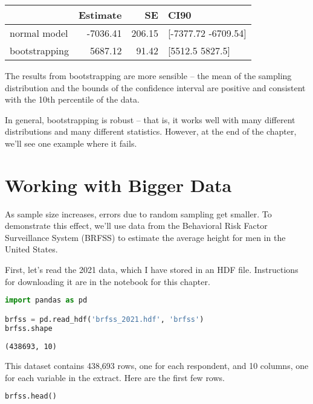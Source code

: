 \begin{tabular}{lrrl}
\toprule
 & Estimate & SE & CI90 \\
\midrule
normal model & -7036.41 & 206.15 & [-7377.72 -6709.54] \\
bootstrapping & 5687.12 & 91.42 & [5512.5 5827.5] \\
\bottomrule
\end{tabular}

The results from bootstrapping are more sensible -- the mean of the
sampling distribution and the bounds of the confidence interval are
positive and consistent with the 10th percentile of the data.

In general, bootstrapping is robust -- that is, it works well with many
different distributions and many different statistics. However, at the
end of the chapter, we'll see one example where it fails.

\section{Working with Bigger Data}\label{working-with-bigger-data}

As sample size increases, errors due to random sampling get smaller. To
demonstrate this effect, we'll use data from the Behavioral Risk Factor
Surveillance System (BRFSS) to estimate the average height for men in
the United States.

\pagebreak

First, let's read the 2021 data, which I have stored in an HDF file.
Instructions for downloading it are in the notebook for this chapter.

\begin{lstlisting}[language=Python,style=source]
import pandas as pd

brfss = pd.read_hdf('brfss_2021.hdf', 'brfss')
brfss.shape
\end{lstlisting}

\begin{lstlisting}[style=output]
(438693, 10)
\end{lstlisting}

This dataset contains 438,693 rows, one for each respondent, and 10
columns, one for each variable in the extract. Here are the first few
rows.

\begin{lstlisting}[language=Python,style=source]
brfss.head()
\end{lstlisting}



